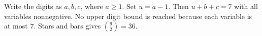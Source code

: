 Write the digits as $a,b,c$, where $a\ge1$. Set $u=a-1$. Then $u+b+c=7$ with all variables nonnegative. No upper digit bound is reached because each variable is at most $7$. Stars and bars gives $\binom92=\boxed{36}$.
